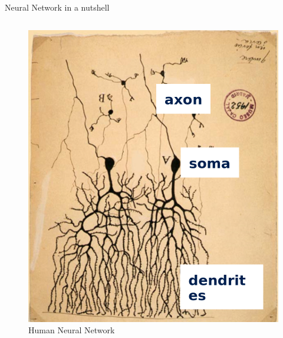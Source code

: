 \documentclass[10pt]{beamer}
\begin{document}
\begin{frame}[t]{Neural Network in a nutshell}
\begin{columns}
\begin{column}{0.5\textwidth}
\begin{center}
\begin{figure}
						\includegraphics[width=0.9\linewidth]{images/didl2}
						\caption{Human Neural Network}
					\end{figure}
				\end{center}
			\end{column}
		\end{columns}
	\end{frame}
\end{document}
